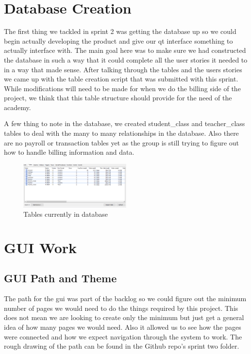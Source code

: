 \documentclass[11pt]{book}
\begin{document}
\section{Database Creation}

The first thing we tackled in sprint 2 was getting the database up so we could begin actually developing the product and give our qt interface something to actually interface with. The main goal here was to make sure we had constructed the database in such a way that it could complete all the user stories it needed to in a way that made sense. After talking through the tables and the users stories we came up with the table creation script that was submitted with this sprint. While modifications will need to be made for when we do the billing side of the project, we think that this table structure should provide for the need of the academy.

A few thing to note in the database, we created student\_class and teacher\_class tables to deal with the many to many relationships in the database. Also there are no payroll or transaction tables yet as the group is still trying to figure out how to handle billing information and data.


\begin{figure}
\caption{Tables currently in database}
\centering
\includegraphics[width=0.5\textwidth]{database_tables}
\end{figure}

\section{GUI Work}

\subsection{GUI Path and Theme}

The path for the gui was part of the backlog so we could figure out the minimum number of pages we would need to do the things required by this project. This does not mean we are looking to create only the minimum but just get a general idea of how many pages we would need. Also it allowed us to see how the pages were connected and how we expect navigation through the system to work. The rough drawing of the path can be found in the Github repo's sprint two folder.
\end{document}
